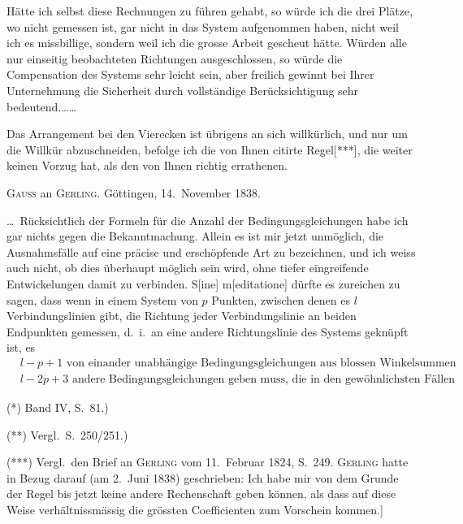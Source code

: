 \documentclass[12pt,a4paper]{article}
\theoremstyle{plain}
\theoremstyle{definition}
\theoremstyle{remark}
\begin{document}
H\"atte ich selbst diese Rechnungen zu f\"uhren gehabt, so w\"urde ich die drei Pl\"atze, wo nicht gemessen ist, gar nicht in das System aufgenommen haben, nicht weil ich es missbillige, sondern weil ich die grosse Arbeit gescheut h\"atte. W\"urden alle nur einseitig beobachteten Richtungen ausgeschlossen, so w\"urde die Compensation des Systems sehr leicht sein, aber freilich gewinnt bei Ihrer Unternehmung die Sicherheit durch vollst\"andige Ber\"ucksichtigung sehr bedeutend.\ldots\ldots

Das Arrangement bei den Vierecken ist \"ubrigens an sich willk\"urlich, und nur um die Willk\"ur abzuschneiden, befolge ich die von Ihnen citirte Regel[***], die weiter keinen Vorzug hat, als den von Ihnen richtig errathenen.

\bigskip\noindent
\textsc{Gauss} an \textsc{Gerling}. G\"ottingen, 14.\ November 1838.

\ldots\ R\"ucksichtlich der Formeln f\"ur die Anzahl der Bedingungsgleichungen habe ich gar nichts gegen die Bekanntmachung. Allein es ist mir jetzt unm\"oglich, die Ausnahmsf\"alle auf eine pr\"acise und ersch\"opfende Art zu bezeichnen, und ich weiss auch nicht, ob dies \"uberhaupt m\"oglich sein wird, ohne tiefer eingreifende Entwickelungen damit zu verbinden. S[ine] m[editatione] d\"urfte es zureichen zu sagen, dass wenn in einem System von $p$ Punkten, zwischen denen es $l$ Verbindungslinien gibt, die Richtung jeder Verbindungslinie an beiden Endpunkten gemessen, d.\ i.\ an eine andere Richtungslinie des Systems gekn\"upft ist, es
\begin{align*}
&\text{$l - p + 1$ von einander unabh\"angige Bedingungsgleichungen aus blossen Winkelsummen und ausserdem noch}\\
&\text{$l - 2p + 3$ andere Bedingungsgleichungen geben muss, die in den gew\"ohnlichsten F\"allen s\"ammtlich unter die Kategorie der in dem Supplem.\ Theor.\ p.\ 31 unter III*) angef\"uhrten fallen.}
\end{align*}

(*) Band IV, S.\ 81.)

(**) Vergl.\ S.\ 250/251.)

(***) Vergl.\ den Brief an \textsc{Gerling} vom 11.\ Februar 1824, S.\ 249. \textsc{Gerling} hatte in Bezug darauf (am 2.\ Juni 1838) geschrieben: \glqq{}Ich habe mir von dem Grunde der Regel bis jetzt keine andere Rechenschaft geben k\"onnen, als dass auf diese Weise verh\"altnissm\"assig die gr\"ossten Coefficienten zum Vorschein kommen.\grqq{}]
\end{document}
